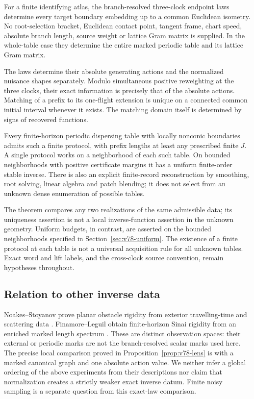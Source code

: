 \begin{theorem}
\label{thm:v78-main}\label{thm:v77-main}
For a finite identifying atlas, the branch-resolved three-clock endpoint
laws determine every target boundary embedding up to a common Euclidean
isometry.  No root-selection bracket, Euclidean contact point, tangent
frame, chart speed, absolute branch length, source weight or lattice
Gram matrix is supplied.  In the whole-table case they determine the
entire marked periodic table and its lattice Gram matrix.

The laws determine their absolute generating actions and the normalized
nuisance shapes separately.  Modulo simultaneous positive reweighting
at the three clocks, their exact information is precisely that of the
absolute actions.  Matching of a prefix to its one-flight extension is
unique on a connected common initial interval whenever it exists.
The matching domain itself is determined by signs of recovered functions.

Every finite-horizon periodic dispersing table with locally nonconic
boundaries admits such a finite protocol, with prefix lengths at least
any prescribed finite $J$.  A single protocol works on a neighborhood
of each such table.  On bounded neighborhoods with positive certificate
margins it has a uniform finite-order stable inverse.  There is also an
explicit finite-record reconstruction by smoothing, root solving,
linear algebra and patch blending; it does not select from an unknown
dense enumeration of possible tables.
\end{theorem}

The theorem compares any two realizations of the same admissible data;
its uniqueness assertion is not a local inverse-function assertion in
the unknown geometry.  Uniform budgets, in contrast, are asserted on the
bounded neighborhoods specified in Section~\ref{sec:v78-uniform}.
The existence of a finite protocol at each table is not a universal
acquisition rule for all unknown tables.  Exact word and lift labels,
and the cross-clock source convention, remain hypotheses throughout.

\subsection{Relation to other inverse data}
Noakes--Stoyanov prove planar obstacle rigidity from exterior travelling-time
and scattering data \cite{NoakesStoyanov2020}.  Finamore--Leguil obtain
finite-horizon Sinai rigidity from an enriched marked length spectrum
\cite{FinamoreLeguil}.  These are distinct observation spaces: their
external or periodic marks are not the branch-resolved scalar marks used
here.  The precise local comparison proved in
Proposition~\ref{prop:v78-lens} is with a marked canonical graph and one
absolute action value.  We neither infer a global ordering of the above
experiments from their descriptions nor claim that normalization creates
a strictly weaker exact inverse datum.  Finite noisy sampling is a
separate question from this exact-law comparison.


